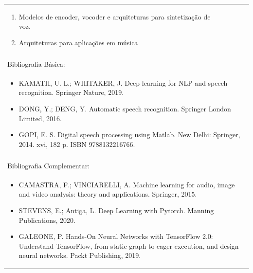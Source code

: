 \documentclass[11pt]{article}
\begin{document}
\begin{center}
\begin{longtable}{|p{4cm}|p{4cm}|p{4cm}|p{4cm}|}
{\begin{enumerate}
\item Modelos de encoder, vocoder e arquiteturas para sintetização de voz.
\item Arquiteturas para aplicações em música\end{enumerate}}\\
\multicolumn{4}{|p{16cm}|}{}\\
\hline
\multicolumn{4}{|p{16cm}|}{Bibliografia Básica:}\\
\multicolumn{4}{|p{\dimexpr 16cm + 6\tabcolsep\relax}|}{%
\begin{itemize}\item KAMATH, U. L.; WHITAKER, J. Deep learning for NLP and speech recognition. Springer Nature, 2019.
\item DONG, Y.; DENG, Y. Automatic speech recognition. Springer London Limited, 2016.
\item GOPI, E. S. Digital speech processing using Matlab. New Delhi: Springer, 2014. xvi, 182 p. ISBN 9788132216766.\end{itemize}}\\
\multicolumn{4}{|p{16cm}|}{}\\
\hline
\multicolumn{4}{|p{16cm}|}{Bibliografia Complementar:}\\
\multicolumn{4}{|p{\dimexpr 16cm + 6\tabcolsep\relax}|}{%
\begin{itemize}\item CAMASTRA, F.; VINCIARELLI, A. Machine learning for audio, image and video analysis: theory and applications. Springer, 2015.
\item STEVENS, E.; Antiga, L. Deep Learning with Pytorch. Manning Publications, 2020.
\item GALEONE, P. Hands-On Neural Networks with TensorFlow 2.0: Understand TensorFlow, from static graph to eager execution, and design neural networks. Packt Publishing, 2019.\end{itemize}}\\
\hline
\end{longtable}
\end{center}
\end{document}
